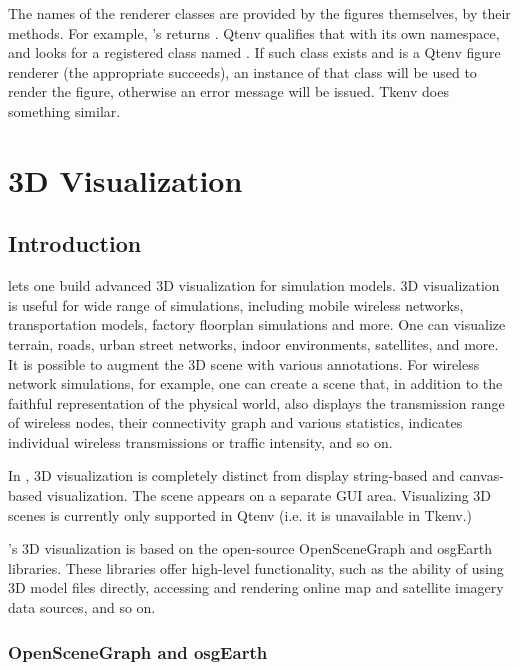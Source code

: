 The names of the renderer classes are provided by the figures themselves,
by their  methods. For example,
's  returns
. Qtenv qualifies that with its own namespace, and
looks for a registered class named
. If such class exists and is a
Qtenv figure renderer (the appropriate  succeeds), an
instance of that class will be used to render the figure, otherwise an
error message will be issued. Tkenv does something similar.


\section{3D Visualization}
\label{sec:ch-graphics:osg}

\subsection{Introduction}

{\opp} lets one build advanced 3D visualization for simulation models.
3D visualization is useful for wide range of simulations, including
mobile wireless networks, transportation models, factory floorplan
simulations and more. One can visualize terrain, roads, urban street
networks, indoor environments, satellites, and more. It is possible to
augment the 3D scene with various annotations. For wireless network
simulations, for example, one can create a scene that, in addition to
the faithful representation of the physical world, also displays the
transmission range of wireless nodes, their connectivity graph
and various statistics, indicates individual wireless transmissions
or traffic intensity, and so on.

In {\opp}, 3D visualization is completely distinct from display
string-based and canvas-based visualization. The scene appears on a
separate GUI area. Visualizing 3D scenes is currently only supported
in Qtenv (i.e. it is unavailable in Tkenv.)

{\opp}'s 3D visualization is based on the open-source OpenSceneGraph
and osgEarth libraries. These libraries offer high-level functionality,
such as the ability of using 3D model files directly, accessing and
rendering online map and satellite imagery data sources, and so on.

\subsubsection{OpenSceneGraph and osgEarth}

